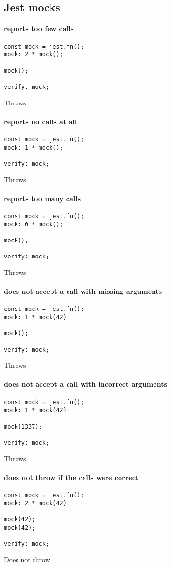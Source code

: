 \subsection*{Jest mocks}

\paragraph*{reports too few calls}
\begin{verbatim}
const mock = jest.fn();
mock: 2 * mock();

mock();

verify: mock;
\end{verbatim}
Throws
\paragraph*{reports no calls at all}
\begin{verbatim}
const mock = jest.fn();
mock: 1 * mock();

verify: mock;
\end{verbatim}
Throws
\paragraph*{reports too many calls}
\begin{verbatim}
const mock = jest.fn();
mock: 0 * mock();

mock();

verify: mock;
\end{verbatim}
Throws
\paragraph*{does not accept a call with missing arguments}
\begin{verbatim}
const mock = jest.fn();
mock: 1 * mock(42);

mock();

verify: mock;
\end{verbatim}
Throws
\paragraph*{does not accept a call with incorrect arguments}
\begin{verbatim}
const mock = jest.fn();
mock: 1 * mock(42);

mock(1337);

verify: mock;
\end{verbatim}
Throws
\paragraph*{does not throw if the calls were correct}
\begin{verbatim}
const mock = jest.fn();
mock: 2 * mock(42);

mock(42);
mock(42);

verify: mock;
\end{verbatim}
Does not throw

